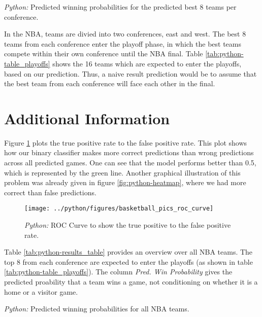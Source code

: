 \documentclass[11pt, a4paper, leqno]{article}
\begin{document}
\begin{table}[H]
    \caption{\label{tab:python-table_playoffs}\emph{Python:} Predicted winning probabilities for the predicted best 8 teams per conference.}
    
\end{table}

In the NBA, teams are divied into two conferences, east and west. The best 8 teams from each conference enter the playoff phase, in which the best teams compete within their own conference until the NBA final.
Table \ref{tab:python-table_playoffs} shows the 16 teams which are expected to enter the playoffs, based on our prediction. Thus, a naive result prediction would be to assume that the best team from each conference will face each other in the final.
\clearpage
\section{Additional Information}

Figure \ref{fig:python-roc_curve} plots the true positive rate to the false positive rate. This plot shows how our binary classifier makes more correct predictions than wrong predictions across all predicted games. One can see that the model performs better than 0.5, which is represented by the green line. Another graphical illustration of this problem was already given in figure \ref{fig:python-heatmap}, where we had more correct than false predictions.

\begin{figure}[H]
   \centering
    \caption{\emph{Python:} ROC Curve to show the true positive to the false positive rate.}
    \texttt{[image: ../python/figures/basketball\_pics\_roc\_curve]}
    \label{fig:python-roc_curve}

\end{figure}
Table \ref{tab:python-results_table} provides an overview over all NBA teams. The top 8 from each conference are expected to enter the playoffs (as shown in table \ref{tab:python-table_playoffs}). The column \textit{Pred. Win Probability} gives the predicted proability that a team wins a game, not conditioning on whether it is a home or a visitor game.
\begin{table}[H]

    \caption{\label{tab:python-results_table}\emph{Python:} Predicted winning probabilities for all NBA teams.}
    \begin{adjustbox}{width=\columnwidth,center}
    
\end{adjustbox}
\end{table}




\printbibliography
{}
\end{document}
